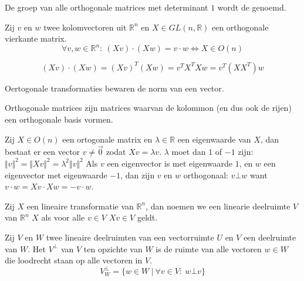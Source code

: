 \documentclass[main.tex]{subfiles}
\begin{document}
\begin{de}
  De groep van alle orthogonale matrices met determinant $1$ wordt de  genoemd.
\end{de}

\begin{st}
  Zij $v$ en $w$ twee kolomvectoren uit $\mathbb{R}^{n}$ en $X \in GL(n,\mathbb{R})$ een orthogonale vierkante matrix.
  \[ \forall v,w \in \mathbb{R}^{n}:\ (Xv)\cdot(Xw) = v \cdot w \Leftrightarrow X \in O(n) \]

\[ (Xv) \cdot (Xw) = (Xv)^{T}(Xw) = v^{T}X^{T}Xw = v^{T}(XX^{T})w \]
\end{st}

\begin{st}
  Oertogonale transformaties bewaren de norm van een vector.
\end{st}

\begin{de}
  Orthogonale matrices zijn matrices waarvan de kolommon (en dus ook de rijen) een orthogonale basis vormen.
\end{de}

\begin{st}
  Zij $X\in O(n)$ een ortogonale matrix en $\lambda\in \mathbb{R}$ een eigenwaarde van $X$, dan bestaat er een vector $v\neq \vec{0}$ zodat $Xv = \lambda v$.
  $\lambda$ moet dan $1$ of $-1$ zijn: $ \Vert v \Vert^{2} = \Vert X v \Vert^{2} = \lambda^{2}\Vert v\Vert^{2}$
  Als $v$ een eigenvector is met eigenwaarde $1$, en $w$ een eigenvector met eigenwaarde $-1$, dan zijn $v$ en $w$ orthogonaal: $v \bot w$
  want $v \cdot w = Xv \cdot Xw = -v \cdot w$.
\end{st}

\begin{de}
  Zij $X$ een lineaire transformatie van $\mathbb{R}^{n}$, dan noemen we een linearie deelruimte $V$ van $\mathbb{R}^{n}$  $X$ als voor alle $v\in V$ $Xv \in V$ geldt.
\end{de}

\begin{de}
  Zij $V$ en $W$ twee lineaire deelruimten van een vectorruimte $U$ en $V$ een deelruimte van $W$.
  Het  $V^{\bot}$ van $V$ ten opzichte van $W$ is de ruimte van alle vectoren $w\in W$ die loodrecht staan op alle vectoren in $V$.
  \[ V^{\bot}_{W} = \{ w \in W\ |\ \forall v \in V:\ w \bot v \} \]
\end{de}
\end{document}

